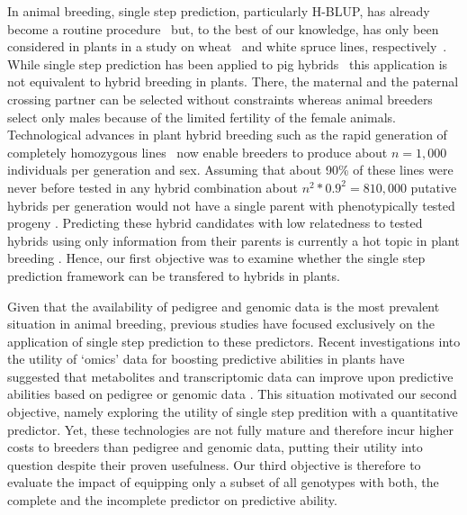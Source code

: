 \documentclass[12pt,titlepage]{article}
\begin{document}
In animal breeding, single step prediction, particularly H-BLUP, has already 
become a routine procedure~\cite{Legarra2014} but, to the best of our knowledge, 
has only been considered in plants in a study on wheat~\cite{Ashraf2016} and
white spruce lines, respectively~\cite{Ratcliffe2017}.
While single step prediction has been applied to pig hybrids~\cite{Xiang2016}
this application is not equivalent to hybrid breeding in plants.
There, the maternal and the paternal crossing partner can be selected without
constraints whereas animal breeders select only males because of the limited
fertility of the female animals.
Technological advances in plant hybrid breeding such as the rapid generation
of completely homozygous lines~\cite{Wedzony2009} now enable breeders to
produce about $n = 1,000$ individuals per generation and sex.
Assuming that about 90\% of these lines were never before tested in any hybrid
combination about $n^{2} * 0.9^{2} = 810,000$ putative hybrids per generation
would not have a single parent with phenotypically tested progeny
\cite{Westhues2017}.
Predicting these hybrid candidates with low relatedness to tested hybrids using
only information from their parents is currently a hot topic in plant breeding
\cite{Technow2014,Kadam2016,Westhues2017}.
Hence, our first objective was to examine whether the single step prediction 
framework can be transfered to hybrids in plants.

Given that the availability of pedigree and genomic data is the most prevalent
situation in animal breeding, previous studies have focused exclusively on the
application of single step prediction to these predictors.
Recent investigations into the utility of `omics' data for boosting predictive
abilities in plants have suggested that metabolites and transcriptomic data can
improve upon predictive abilities based on pedigree or genomic data
\cite{Guo2016,Xu2016,Dan2016,Zenke-Philippi2017,Westhues2017}.
This situation motivated our second objective, namely exploring the utility of
single step predition with a quantitative predictor.
Yet, these technologies are not fully mature and therefore incur higher costs
to breeders than pedigree and genomic data, putting their utility into question
despite their proven usefulness.
Our third objective is therefore to evaluate the impact of equipping only a
subset of all genotypes with both, the complete and the incomplete predictor on
predictive ability.
\end{document}
